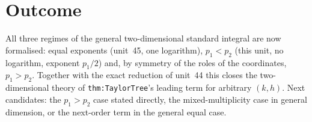 \documentclass[11pt]{article}
\begin{document}
\section{Outcome}
All three regimes of the general two-dimensional standard integral are now formalised: equal exponents
(unit~45, one logarithm), $p_1<p_2$ (this unit, no logarithm, exponent $p_1/2$) and, by symmetry of
the roles of the coordinates, $p_1>p_2$. Together with the exact reduction of unit~44 this closes the
two-dimensional theory of \texttt{thm:TaylorTree}'s leading term for arbitrary $(k,h)$. Next
candidates: the $p_1>p_2$ case stated directly, the mixed-multiplicity case in general dimension, or
the next-order term in the general equal case.
\end{document}
